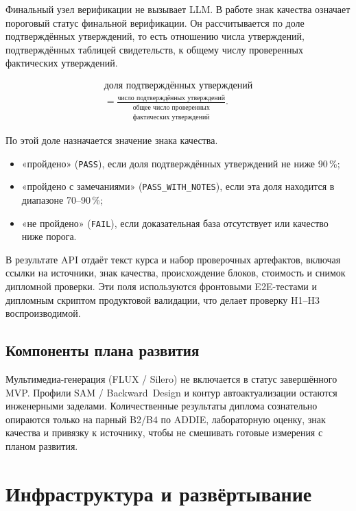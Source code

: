Финальный узел верификации не вызывает LLM. В работе знак качества
означает пороговый статус финальной верификации. Он рассчитывается
по доле подтверждённых утверждений, то есть отношению числа утверждений,
подтверждённых таблицей свидетельств, к общему числу проверенных
фактических утверждений.

\[
\begin{gathered}
\text{доля подтверждённых утверждений} \\[0.4em]
=
\frac{\text{число подтверждённых утверждений}}
{\begin{gathered}
  \text{общее число проверенных}\\
  \text{фактических утверждений}
\end{gathered}}.
\end{gathered}
\]

По этой доле назначается значение знака качества.

\begin{itemize}
  \item «пройдено» (\texttt{PASS}), если доля подтверждённых утверждений не ниже 90\,\%;
  \item «пройдено с замечаниями» (\texttt{PASS\_WITH\_NOTES}), если эта доля находится в диапазоне
    70–90\,\%;
  \item «не пройдено» (\texttt{FAIL}), если доказательная база отсутствует или качество ниже
    порога.
\end{itemize}

В результате API отдаёт текст курса и набор проверочных
артефактов, включая ссылки на источники, знак качества, происхождение блоков,
стоимость и снимок дипломной проверки. Эти поля используются фронтовыми
E2E-тестами и дипломным скриптом продуктовой валидации, что делает
проверку H1–H3 воспроизводимой.

\subsection{Компоненты плана развития}

Мультимедиа-генерация (FLUX / Silero) не включается в статус
завершённого MVP. Профили SAM / Backward~Design и контур
автоактуализации остаются инженерными заделами. Количественные
результаты диплома сознательно опираются только на парный B2/B4 по ADDIE,
лабораторную оценку, знак качества и привязку к источнику, чтобы не смешивать
готовые измерения с планом развития.

\section{Инфраструктура и развёртывание}

